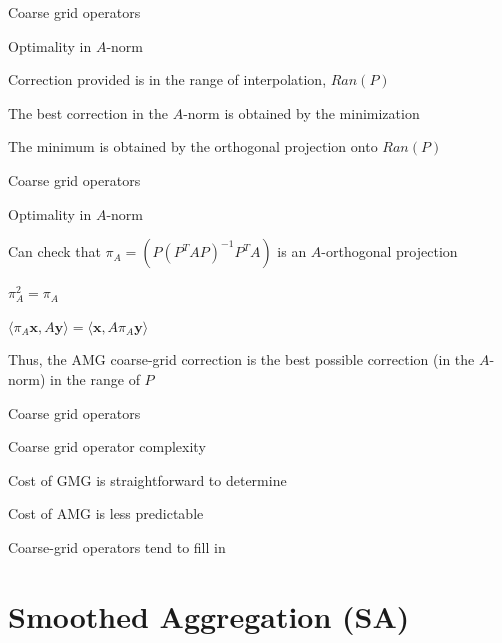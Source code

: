 \documentclass[18pt,xcolor=table]{beamer}
\begin{document}
\begin{frame}{Coarse grid operators}
\begin{block}{Optimality in $A$-norm}
\bit
\item Correction provided is in the range of interpolation, $Ran(P)$
\item The best correction in the $A$-norm is obtained by the minimization
\item The minimum is obtained by the orthogonal projection onto $Ran(P)$
\eit
\end{block}
\end{frame}

\begin{frame}{Coarse grid operators}
\begin{block}{Optimality in $A$-norm}
\bit
\item Can check that $\pi_A = (P(P^TAP)^{-1}P^TA)$ is an $A$-orthogonal projection
\bit
\item $\pi_A^2 = \pi_A$
\item $\langle \pi_A \mathbf{x}, A \mathbf{y} \rangle = \langle \mathbf{x}, A \pi_A\mathbf{y} \rangle$
\eit
\item Thus, the AMG coarse-grid correction is the best possible correction (in the $A$-norm) in the range of $P$
\eit
\end{block}
\end{frame}

\begin{frame}{Coarse grid operators}
\begin{block}{Coarse grid operator complexity}
\bit
\item Cost of GMG is straightforward to determine
\item Cost of AMG is less predictable
\item Coarse-grid operators tend to fill in
\eit
\end{block}
\end{frame}


\section{Smoothed Aggregation (SA)}
\end{document}
